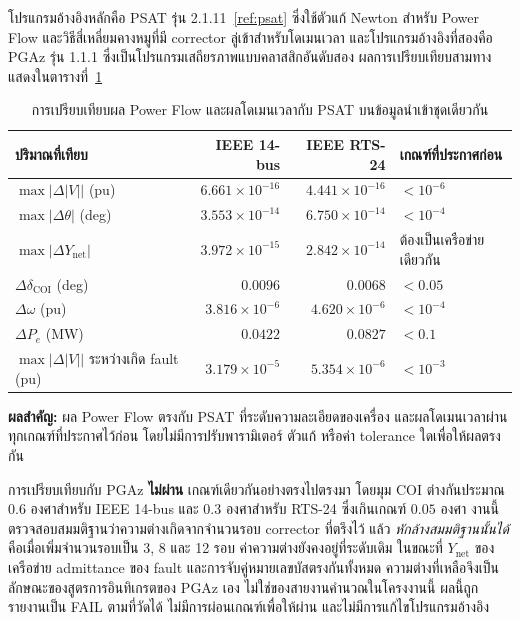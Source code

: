 \documentclass[12pt,a4paper]{article}
\newcommand{\tableheader}{\rowcolor{tablehead}}
\newcommand{\resultbox}[1]{\par\noindent\colorbox{academicgray}{\parbox{\dimexpr\textwidth-2\fboxsep\relax}{\textbf{ผลสำคัญ:} #1}}\par}
\begin{document}
โปรแกรมอ้างอิงหลักคือ PSAT รุ่น 2.1.11~\ref{ref:psat} ซึ่งใช้ตัวแก้ Newton สำหรับ Power Flow และวิธีสี่เหลี่ยมคางหมูที่มี corrector ลู่เข้าสำหรับโดเมนเวลา และโปรแกรมอ้างอิงที่สองคือ PGAz รุ่น 1.1.1 ซึ่งเป็นโปรแกรมเสถียรภาพแบบคลาสสิกอันดับสอง ผลการเปรียบเทียบสามทางแสดงในตารางที่~\ref{tab:validation_ext}
\begin{table}[H]
\centering
\caption{การเปรียบเทียบผล Power Flow และผลโดเมนเวลากับ PSAT บนข้อมูลนำเข้าชุดเดียวกัน}
\label{tab:validation_ext}
\begin{tabularx}{0.99\textwidth}{@{}l r r X@{}}
\toprule
\tableheader ปริมาณที่เทียบ & IEEE 14-bus & IEEE RTS-24 & เกณฑ์ที่ประกาศก่อน \\
\midrule
$\max|\Delta|V||$ (pu) & $6.661\times10^{-16}$ & $4.441\times10^{-16}$ & $<10^{-6}$ \\
$\max|\Delta\theta|$ (deg) & $3.553\times10^{-14}$ & $6.750\times10^{-14}$ & $<10^{-4}$ \\
$\max|\Delta Y_{\mathrm{net}}|$ & $3.972\times10^{-15}$ & $2.842\times10^{-14}$ & ต้องเป็นเครือข่ายเดียวกัน \\
$\Delta\delta_{\mathrm{COI}}$ (deg) & $0.0096$ & $0.0068$ & $<0.05$ \\
$\Delta\omega$ (pu) & $3.816\times10^{-6}$ & $4.620\times10^{-6}$ & $<10^{-4}$ \\
$\Delta P_e$ (MW) & $0.0422$ & $0.0827$ & $<0.1$ \\
$\max|\Delta|V||$ ระหว่างเกิด fault (pu) & $3.179\times10^{-5}$ & $5.354\times10^{-6}$ & $<10^{-3}$ \\
\bottomrule
\end{tabularx}
\end{table}
\resultbox{ผล Power Flow ตรงกับ PSAT ที่ระดับความละเอียดของเครื่อง และผลโดเมนเวลาผ่านทุกเกณฑ์ที่ประกาศไว้ก่อน โดยไม่มีการปรับพารามิเตอร์ ตัวแก้ หรือค่า tolerance ใดเพื่อให้ผลตรงกัน}

การเปรียบเทียบกับ PGAz \textbf{ไม่ผ่าน} เกณฑ์เดียวกันอย่างตรงไปตรงมา โดยมุม COI ต่างกันประมาณ $0.6$ องศาสำหรับ IEEE 14-bus และ $0.3$ องศาสำหรับ RTS-24 ซึ่งเกินเกณฑ์ $0.05$ องศา งานนี้ตรวจสอบสมมติฐานว่าความต่างเกิดจากจำนวนรอบ corrector ที่ตรึงไว้ แล้ว \emph{หักล้างสมมติฐานนั้นได้} คือเมื่อเพิ่มจำนวนรอบเป็น 3, 8 และ 12 รอบ ค่าความต่างยังคงอยู่ที่ระดับเดิม ในขณะที่ $Y_{\mathrm{net}}$ ของเครือข่าย admittance ของ fault และการจับคู่หมายเลขบัสตรงกันทั้งหมด ความต่างที่เหลือจึงเป็นลักษณะของสูตรการอินทิเกรตของ PGAz เอง ไม่ใช่ของสายงานคำนวณในโครงงานนี้ ผลนี้ถูกรายงานเป็น FAIL ตามที่วัดได้ ไม่มีการผ่อนเกณฑ์เพื่อให้ผ่าน และไม่มีการแก้ไขโปรแกรมอ้างอิง
\end{document}
